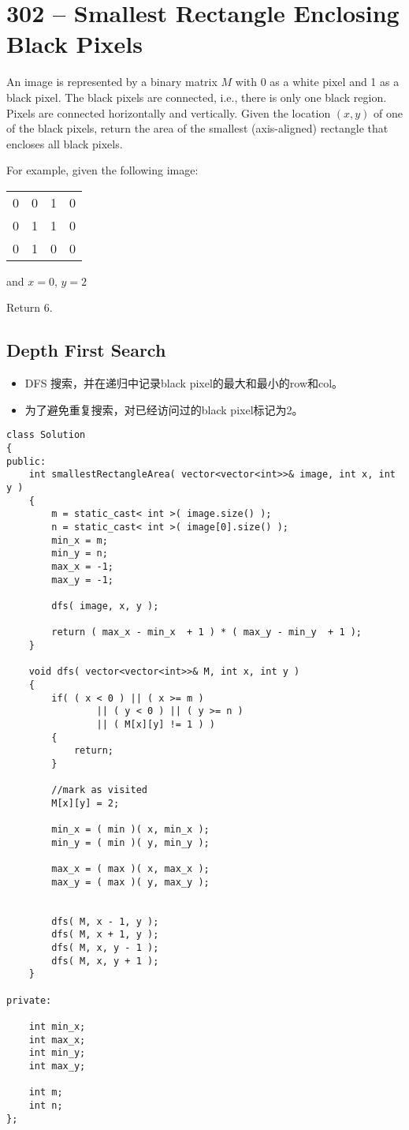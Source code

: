 \section{302 -- Smallest Rectangle Enclosing Black Pixels}
An image is represented by a binary matrix $M$ with 0 as a white pixel and 1 as a black pixel. The black pixels are connected, i.e., there is only one black region. Pixels are connected horizontally and vertically. Given the location $(x, y)$ of one of the black pixels, return the area of the smallest (axis-aligned) rectangle that encloses all black pixels.
\par
For example, given the following image:
\begin{flushleft}
\begin{table}[H]
\begin{tabular}{cccc}
0 & 0 & 1 & 0\\
0 & 1 & 1 & 0\\
0 & 1 & 0 & 0
\end{tabular}
\end{table}
and $x = 0$, $y = 2$
\par
Return 6.
\end{flushleft}
\subsection{Depth First Search}
\begin{itemize}
\item DFS 搜索，并在递归中记录black pixel的最大和最小的row和col。
\item 为了避免重复搜索，对已经访问过的black pixel标记为2。
\end{itemize}
\setcounter{lstlisting}{0}
\begin{lstlisting}[style=customc, caption={Depth First Search}]
class Solution
{
public:
    int smallestRectangleArea( vector<vector<int>>& image, int x, int y )
    {
        m = static_cast< int >( image.size() );
        n = static_cast< int >( image[0].size() );
        min_x = m;
        min_y = n;
        max_x = -1;
        max_y = -1;

        dfs( image, x, y );
		
        return ( max_x - min_x  + 1 ) * ( max_y - min_y  + 1 );
    }

    void dfs( vector<vector<int>>& M, int x, int y )
    {
        if( ( x < 0 ) || ( x >= m )
                || ( y < 0 ) || ( y >= n )
                || ( M[x][y] != 1 ) )
        {
            return;
        }

        //mark as visited
        M[x][y] = 2;

        min_x = ( min )( x, min_x );
        min_y = ( min )( y, min_y );

        max_x = ( max )( x, max_x );
        max_y = ( max )( y, max_y );


        dfs( M, x - 1, y );
        dfs( M, x + 1, y );
        dfs( M, x, y - 1 );
        dfs( M, x, y + 1 );
    }

private:

    int min_x;
    int max_x;
    int min_y;
    int max_y;

    int m;
    int n;
};
\end{lstlisting}

